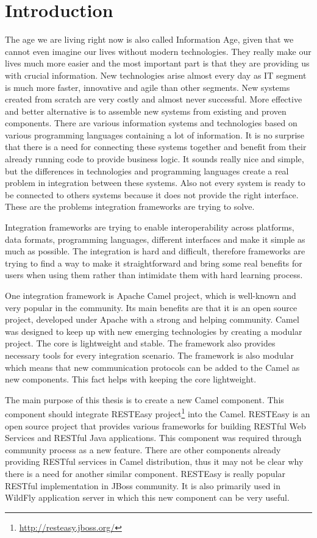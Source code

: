 \documentclass[12pt,final,oneside]{fithesis2}
\begin{document}
\chapter{Introduction}
The age we are living right now is also called Information Age, given that we cannot even imagine our lives without modern technologies. They really make our lives much more easier and the most important part is that they are providing us with crucial information. New technologies arise almost every day as IT segment is much more faster, innovative and agile than other segments. New systems created from scratch are very costly and almost never successful. More effective and better alternative is to assemble new systems from existing and proven components. There are various information systems and technologies based on various programming languages containing a lot of information. It is no surprise that there is a need for connecting these systems together and benefit from their already running code to provide business logic. It sounds really nice and simple, but the differences in technologies and programming languages create a real problem in integration between these systems. Also not every system is ready to be connected to others systems because it does not provide the right interface. These are the problems integration frameworks are trying to solve.

Integration frameworks are trying to enable interoperability across platforms, data formats, programming languages, different interfaces and make it simple as much as possible. The integration is hard and difficult, therefore frameworks are trying to find a way to make it straightforward and bring some real benefits for users when using them rather than intimidate them with hard learning process.

One integration framework is Apache Camel project\cite{camel-web}, which is well-known and very popular in the community. Its main benefits are that it is an open source project, developed under Apache with a strong and helping community. Camel was designed to keep up with new emerging technologies by creating a modular project. The core is lightweight and stable. The framework also provides necessary tools for every integration scenario. The framework is also modular which means that new communication protocols can be added to the Camel as new components. This fact helps with keeping the core lightweight. 

The main purpose of this thesis is to create a new Camel component. This component should integrate RESTEasy project\footnote{\url{http://resteasy.jboss.org/}} into the Camel. RESTEasy is an open source project that provides various frameworks for building RESTful Web Services and RESTful Java applications. This component was required through community process as a new feature. There are other components already providing RESTful services in Camel distribution, thus it may not be clear why there is a need for another similar component. RESTEasy is really popular RESTful implementation in JBoss community. It is also primarily used in WildFly application server in which this new component can be very useful.
\end{document}

